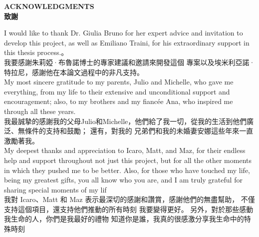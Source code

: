\renewcommand{\baselinestretch}{1.5} %
\clearpage  %
\sectionef
{} %
\begin{center}
\LARGE\textbf{ACKNOWLEDGMENTS}\\
\LARGE\textbf{致謝}\\
\end{center}
\fontsize{14pt}{2.5pt}\sectionef
  {  I would like to thank Dr. Giulia Bruno for her expert advice and invitation to develop this project, as well as Emiliano Traini, for his extraordinary support in this thesis process.}。\\[1pt]

\fontsize{14pt}{5pt}\sectionef
  {  我要感謝朱莉婭·布魯諾博士的專家建議和邀請來開發這個
專案以及埃米利亞諾·特拉尼，感謝他在本論文過程中的非凡支持。}\\[15pt]

\fontsize{14pt}{2.5pt}\sectionef
  {  My most sincere gratitude to my parents, Julio and Michelle, who gave me everything, 
from my life to their extensive and unconditional support and encouragement; also, to my 
brothers and my fiancée Ana, who inspired me through all these years.}\\[1pt]

\fontsize{14pt}{5pt}\sectionef
  {  我最誠摯的感謝我的父母Julio和Michelle，他們給了我一切，從我的生活到他們廣泛、無條件的支持和鼓勵； 還有，對我的
兄弟們和我的未婚妻安娜這些年來一直激勵著我。}\\[15pt]

\fontsize{14pt}{2.5pt}\sectionef
{  My deepest thanks and appreciation to Icaro, Matt, and Maz, for their endless help and 
support throughout not just this project, but for all the other moments in which they pushed 
me to be better. Also, for those who have touched my life, being my greatest gifts, you all 
know who you are, and I am truly grateful for sharing special moments of my lif}\\[1pt]

\fontsize{14pt}{5pt}\sectionef
  {我對 Icaro、Matt 和 Maz 表示最深切的感謝和讚賞，感謝他們的無盡幫助，
不僅支持這個項目，還支持他們推動的所有時刻
我要變得更好。 另外，對於那些感動我生命的人，你們是我最好的禮物
知道你是誰，我真的很感激分享我生命中的特殊時刻}\\[15pt]
